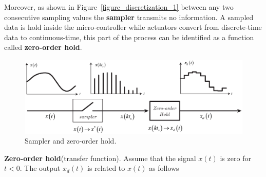 \documentclass[11pt,a4paper,oneside]{book}
\numberwithin{equation}{section}
\theoremstyle{it}
\theoremstyle{definition}
\begin{document}
Moreover, as shown in Figure~\ref{figure_discretization_1} between any two 
consecutive sampling values the \textbf{sampler} transmits no information. A 
sampled data is hold inside the micro-controller while actuators convert from 
discrete-time data to continuous-time, this part of the process can be 
identified as a function called \textbf{zero-order hold}.
\begin{figure}[H]
	\centering
	\includegraphics[width = 450pt, keepaspectratio] {figures/discretization/sampler_zero_order_hold_2.eps}
			\captionsetup{width=0.5\textwidth, font=small}		
			\caption{Sampler and zero-order hold.}
	\label{figure_zero_order_hold}
\end{figure}

\noindent\textbf{Zero-order hold}(transfer function). Assume that the signal 
$x(t)$ is zero for 
$t<0$. The output $x_d(t)$ is related to $x(t)$ as follows
\end{document}

